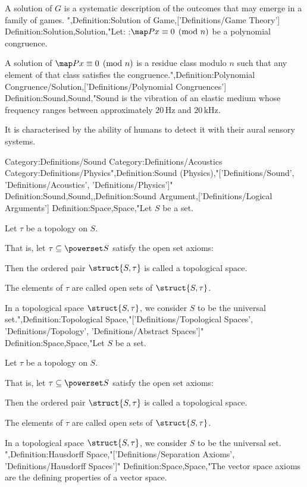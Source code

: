 A solution of $G$ is a systematic description of the outcomes that may emerge in a family of games.
",Definition:Solution of Game,['Definitions/Game Theory']
Definition:Solution,Solution,"Let:
:$\map P x \equiv 0 \pmod n$
be a polynomial congruence.


A solution of $\map P x \equiv 0 \pmod n$ is a residue class modulo $n$ such that any element of that class satisfies the congruence.",Definition:Polynomial Congruence/Solution,['Definitions/Polynomial Congruences']
Definition:Sound,Sound,"Sound is the vibration of an elastic medium whose frequency ranges between approximately $20 \, \text {Hz}$ and $20 \, \text {kHz}$.

It is characterised by the ability of humans to detect it with their aural sensory systems.


Category:Definitions/Sound
Category:Definitions/Acoustics
Category:Definitions/Physics",Definition:Sound (Physics),"['Definitions/Sound', 'Definitions/Acoustics', 'Definitions/Physics']"
Definition:Sound,Sound,,Definition:Sound Argument,['Definitions/Logical Arguments']
Definition:Space,Space,"Let $S$ be a set.

Let $\tau$ be a topology on $S$.

That is, let $\tau \subseteq \powerset S$ satisfy the open set axioms:


Then the ordered pair $\struct {S, \tau}$ is called a topological space.

The elements of $\tau$ are called open sets of $\struct {S, \tau}$.


In a topological space $\struct {S, \tau}$, we consider $S$ to be the universal set.",Definition:Topological Space,"['Definitions/Topological Spaces', 'Definitions/Topology', 'Definitions/Abstract Spaces']"
Definition:Space,Space,"Let $S$ be a set.

Let $\tau$ be a topology on $S$.

That is, let $\tau \subseteq \powerset S$ satisfy the open set axioms:


Then the ordered pair $\struct {S, \tau}$ is called a topological space.

The elements of $\tau$ are called open sets of $\struct {S, \tau}$.


In a topological space $\struct {S, \tau}$, we consider $S$ to be the universal set.
",Definition:Hausdorff Space,"['Definitions/Separation Axioms', 'Definitions/Hausdorff Spaces']"
Definition:Space,Space,"The vector space axioms are the defining properties of a vector space.

